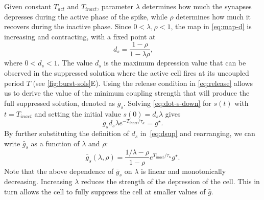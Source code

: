 Given constant $T_{act}$ and $T_{inact}$, parameter $\lambda$ determines how much the synapses depresses during the active phase of the spike, while $\rho$ determines how much it recovers during the inactive phase.
Since $0<\lambda, \rho<1$, the map in \cref{eq:map-d} is increasing and contracting, with a fixed point at
\begin{equation}
	~\label{eq:dsup}
	d_{s}=\frac{1-\rho}{1-\lambda\rho},
\end{equation}
where $0<d_{s}<1$.
The value $d_{s}$ is the maximum depression value that can be observed in the suppressed solution where the active cell fires at its uncoupled period $T$ (see \cref{fig:burst-sols}E).
Using the release condition in \cref{eq:release} allows us to derive the value of the minimum coupling strength that will produce the full suppressed solution, denoted as $\bar g_{s}$.
Solving \cref{eq:dot-s-down} for $s(t)$ with $t=T_{inact}$ and setting the initial value $s(0)=d_s\lambda$ gives \begin{equation}
	\bar g_s d_s\lambda e^{-T_{inact}/\tau_\kappa}=g^{\star}.
\end{equation}
By further substituting the definition of $d_s$ in~\eqref{eq:dsup} and rearranging, we can write $\bar g_s$ as a function of $\lambda$ and $\rho$:
\begin{equation}
	\label{eq:gs}
	\bar g_s(\lambda, \rho) = \frac{1/\lambda-\rho}{1-\rho} e^{T_{inact}/\tau_\kappa}g^\star.
\end{equation}
Note that the above dependence of $\bar g_{s}$ on $\lambda$ is linear and monotonically decreasing.
Increasing $\lambda$ reduces the strength of the depression of the \free{} cell.
This in turn allows the \free{} cell to fully suppress the \suppressed{} cell at smaller values of $\bar g$.

